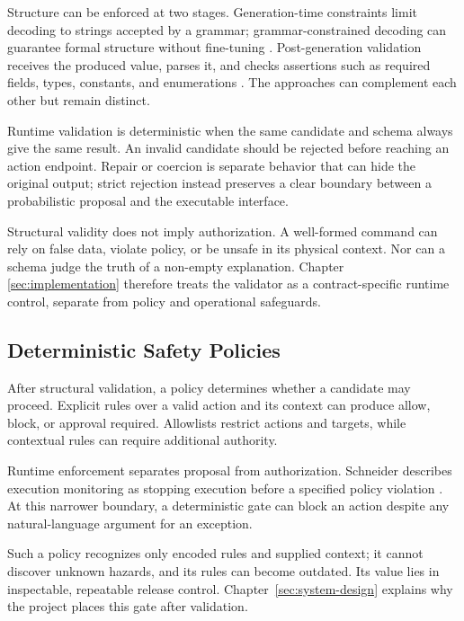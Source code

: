 Structure can be enforced at two stages. Generation-time constraints limit
decoding to strings accepted by a grammar; grammar-constrained decoding can
guarantee formal structure without fine-tuning \cite{geng2023grammar}.
Post-generation validation receives the produced value, parses it, and checks
assertions such as required fields, types, constants, and enumerations
\cite{wright2022jsonschemavalidation}. The approaches can complement each other
but remain distinct.

Runtime validation is deterministic when the same candidate and schema always
give the same result. An invalid candidate should be rejected before reaching an
action endpoint. Repair or coercion is separate behavior that can hide the
original output; strict rejection instead preserves a clear boundary between a
probabilistic proposal and the executable interface.

Structural validity does not imply authorization. A well-formed command can rely
on false data, violate policy, or be unsafe in its physical context. Nor can a
schema judge the truth of a non-empty explanation. Chapter~
\ref{sec:implementation} therefore treats the validator as a contract-specific
runtime control, separate from policy and operational safeguards.

\subsection{Deterministic Safety Policies}\label{subsec:theory-policy}

After structural validation, a policy determines whether a candidate may
proceed. Explicit rules over a valid action and its context can produce allow,
block, or approval required. Allowlists restrict
actions and targets, while contextual rules can require additional authority.

Runtime enforcement separates proposal from authorization. Schneider describes
execution monitoring as stopping execution before a specified policy violation
\cite{schneider2000enforceable}. At this narrower boundary, a deterministic gate
can block an action despite any natural-language argument for an exception.

Such a policy recognizes only encoded rules and supplied context; it cannot
discover unknown hazards, and its rules can become outdated. Its value lies in
inspectable, repeatable release control. Chapter~\ref{sec:system-design}
explains why the project places this gate after validation.

